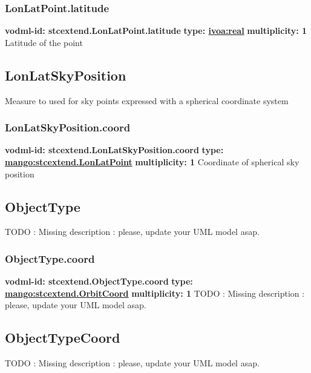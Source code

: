     \subsubsection{LonLatPoint.latitude}
      \textbf{vodml-id: stcextend.LonLatPoint.latitude} \newline
      \textbf{type: \hyperref[sect:ivoa]{ivoa:real}} \newline
      \textbf{multiplicity: 1} \newline 
      Latitude of the point

  \subsection{LonLatSkyPosition}
  \label{sect:stcextend.LonLatSkyPosition}
    Measure to used for sky points expressed with a spherical coordinate system

    \subsubsection{LonLatSkyPosition.coord}
      \textbf{vodml-id: stcextend.LonLatSkyPosition.coord} \newline
      \textbf{type: \hyperref[sect:stcextend.LonLatPoint]{mango:stcextend.LonLatPoint}} \newline
      \textbf{multiplicity: 1} \newline 
      Coordinate of spherical sky position

  \subsection{ObjectType}
  \label{sect:stcextend.ObjectType}
    TODO : Missing description : please, update your UML model asap.

    \subsubsection{ObjectType.coord}
      \textbf{vodml-id: stcextend.ObjectType.coord} \newline
      \textbf{type: \hyperref[sect:stcextend.OrbitCoord]{mango:stcextend.OrbitCoord}} \newline
      \textbf{multiplicity: 1} \newline 
      TODO : Missing description : please, update your UML model asap.

  \subsection{ObjectTypeCoord}
  \label{sect:stcextend.ObjectTypeCoord}
    TODO : Missing description : please, update your UML model asap.

